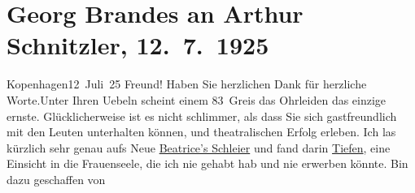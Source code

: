

         
         \renewcommand{\erwaehntePersonen}{Personen:  ?? [Schuldirektor von Georg Brandes], Georg Brandes}
         \renewcommand{\erwaehnteOrte}{Orte: Kopenhagen, Wien}
         \renewcommand{\erwaehnteWerke}{Werke: Der Schleier der Beatrice. Schauspiel in fünf Akten}
               \section[Georg Brandes an Arthur Schnitzler, 12. 7. 1925]{ Georg Brandes an Arthur Schnitzler, 12. 7. 1925}\nopagebreak{}\rehead{ }\begin{ledgroupsized}[t]{13cm}\normalsize\beginnumbering{} \toendnotes[C]{\smallbreak\pagebreak[2]} 
\toendnotes[C]{\smallbreak}\pstart
           \raggedleft{}{\pb}Kopenhagen12 Juli 25\pend
           \pstart
           Freund! Haben Sie herzlichen Dank für herzliche Worte.\hspace*{2em}Unter Ihren Uebeln scheint einem 83 Greis das Ohrleiden
               das einzige ernste. Glücklicherweise ist es nicht schlimmer, als dass Sie sich
               gastfreundlich mit den Leuten unterhalten können, und theatralischen Erfolg erleben.
               Ich las kürzlich sehr genau aufs Neue \uline{Beatrice’s Schleier} und fand darin \uline{Tiefen}, eine Einsicht in die
               Frauenseele, die ich nie gehabt hab und nie erwerben könnte. Bin dazu geschaffen von

\end{ledgroupsized}

